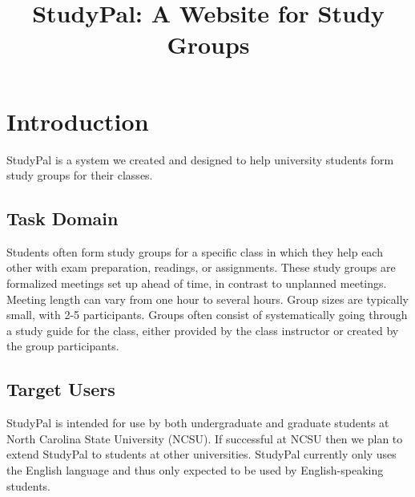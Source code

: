 \documentclass[conference]{IEEEtran}
\begin{document}
\title{StudyPal: A Website for Study Groups}

\author{
\and
{}
}


\maketitle


\begin{abstract}
\blindtext[1]
\end{abstract}

\IEEEpeerreviewmaketitle



\section{Introduction}
StudyPal is a system we created and designed to help university students form study groups for their classes.


\subsection{Task Domain}
Students often form study groups for a specific class in which they help each other with exam preparation, readings, or assignments.
These study groups are formalized meetings set up ahead of time, in contrast to unplanned meetings.
Meeting length can vary from one hour to several hours.
Group sizes are typically small, with 2-5 participants.
Groups often consist of systematically going through a study guide for the class, either provided by the class instructor or created by the group participants.


\subsection{Target Users}
StudyPal is intended for use by both undergraduate and graduate students at North Carolina State University (NCSU).
If successful at NCSU then we plan to extend StudyPal to students at other universities.
StudyPal currently only uses the English language and thus only expected to be used by English-speaking students.
\end{document}
